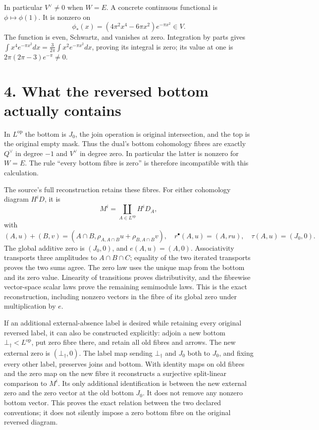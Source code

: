 In particular \(V^\vee\ne0\) when \(W=E\). A concrete continuous
functional is \(\phi\mapsto\phi(1)\). It is nonzero on \[
\phi_*(x)=(4\pi^2x^4-6\pi x^2)e^{-\pi x^2}\in V.
\] The function is even, Schwartz, and vanishes at zero. Integration by
parts gives
\(\int x^4e^{-\pi x^2}dx=\frac{3}{2\pi}\int x^2e^{-\pi x^2}dx\), proving
its integral is zero; its value at one is \(2\pi(2\pi-3)e^{-\pi}\ne0\).

\section{4. What the reversed bottom actually
contains}\label{TranscriptStage:proof03:what-the-reversed-bottom-actually-contains}

In \(L^{\mathrm{op}}\) the bottom is \(J_0\), the join operation is
original intersection, and the top is the original empty mask. Thus the
dual's bottom cohomology fibres are exactly \(Q^\vee\) in degree \(-1\)
and \(V^\vee\) in degree zero. In particular the latter is nonzero for
\(W=E\). The rule ``every bottom fibre is zero'' is therefore
incompatible with this calculation.

The source's full reconstruction retains these fibres. For either
cohomology diagram \(H^iD\), it is \[
M^i=\coprod_{A\in L^{\mathrm{op}}}H^iD_A,
\] with \[
(A,u)+(B,v)=
(A\cap B,\rho_{A,A\cap B}u+\rho_{B,A\cap B}v),
\quad
r^\bullet(A,u)=(A,ru),
\quad
\tau(A,u)=(J_0,0).
\] The global additive zero is \((J_0,0)\), and \(e(A,u)=(A,0)\).
Associativity transports three amplitudes to \(A\cap B\cap C\); equality
of the two iterated transports proves the two sums agree. The zero law
uses the unique map from the bottom and its zero value. Linearity of
transitions proves distributivity, and the fibrewise vector-space scalar
laws prove the remaining semimodule laws. This is the exact
reconstruction, including nonzero vectors in the fibre of its global
zero under multiplication by \(e\).

If an additional external-absence label is desired while retaining every
original reversed label, it can also be constructed explicitly: adjoin a
new bottom \(\bot_\dagger<L^{\mathrm{op}}\), put zero fibre there, and
retain all old fibres and arrows. The new external zero is
\((\bot_\dagger,0)\). The label map sending \(\bot_\dagger\) and \(J_0\)
both to \(J_0\), and fixing every other label, preserves joins and
bottom. With identity maps on old fibres and the zero map on the new
fibre it reconstructs a surjective split-linear comparison to \(M^i\).
Its only additional identification is between the new external zero and
the zero vector at the old bottom \(J_0\). It does not remove any
nonzero bottom vector. This proves the exact relation between the two
declared conventions; it does not silently impose a zero bottom fibre on
the original reversed diagram.

